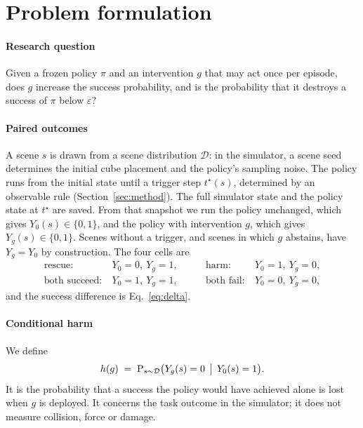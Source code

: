 \section{Problem formulation}\label{sec:problem}

\paragraph{Research question} Given a frozen policy $\pi$ and an intervention $g$ that may act once per episode, does $g$ increase the success probability, and is the probability that it destroys a success of $\pi$ below $\varepsilon$?

\paragraph{Paired outcomes} A scene $s$ is drawn from a scene distribution $\mathcal{D}$: in the simulator, a scene seed determines the initial cube placement and the policy's sampling noise. The policy runs from the initial state until a trigger step $t^\star(s)$, determined by an observable rule (Section~\ref{sec:method}). The full simulator state and the policy state at $t^\star$ are saved. From that snapshot we run the policy unchanged, which gives $Y_0(s)\in\{0,1\}$, and the policy with intervention $g$, which gives $Y_g(s)\in\{0,1\}$. Scenes without a trigger, and scenes in which $g$ abstains, have $Y_g=Y_0$ by construction. The four cells are
\begin{equation}
\begin{aligned}
\text{rescue}: &\ Y_0=0,\ Y_g=1, & \qquad \text{harm}: &\ Y_0=1,\ Y_g=0,\\
\text{both succeed}: &\ Y_0=1,\ Y_g=1, & \qquad \text{both fail}: &\ Y_0=0,\ Y_g=0,
\end{aligned}
\end{equation}
and the success difference is Eq.~\eqref{eq:delta}.

\paragraph{Conditional harm} We define
\begin{equation}
h(g) \;=\; \Pr_{s\sim\mathcal{D}}\bigl(Y_g(s)=0 \,\bigm|\, Y_0(s)=1\bigr).
\end{equation}
It is the probability that a success the policy would have achieved alone is lost when $g$ is deployed. It concerns the task outcome in the simulator; it does not measure collision, force or damage.

